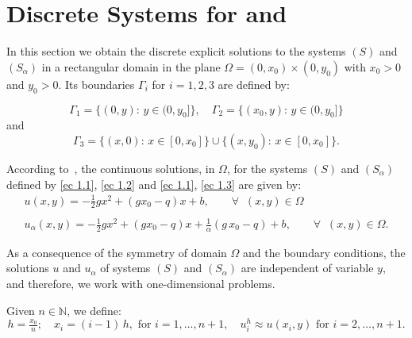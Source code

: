 \documentclass[11pt]{article}
\begin{document}


\section{Discrete Systems for  and }\label{sec2} %

In this section we obtain the discrete explicit solutions to the  systems $(S)$ and $(S_\alpha)$ in a rectangular  domain in the plane  $\Omega = (0, x_0) \times (0, y_0)$ with $x_0>0$ and $y_0 > 0$. Its boundaries $\Gamma_i$ for $i=1,2,3$  are defined by:


     \[\Gamma_1= \{(0,y):\, y\in (0,y_0]\}, \quad \Gamma_2= \{(x_0,y):\, y\in (0,y_0]\} \]
      and
 \[ \Gamma_3= \{(x,0):\, x\in [0,x_0]\} \cup \{(x,y_0):\, x\in [0,x_0]\}.\]
    
According to~\cite{BoGaTa2020}, the continuous solutions, in $\Omega$, for the systems $(S)$ and $(S_\alpha)$ defined by \eqref{ec 1.1}, \eqref{ec 1.2}
and \eqref{ec 1.1}, \eqref{ec 1.3} are given by:
\begin{equation}\label{Def: u y ualpha}
\begin{array}{ll}
 u (x, y) = -\tfrac{1}{2} g x^2 + (g x_0 - q) x +b, \qquad \forall \;\; (x,y) \in \Omega   \\ 
 \\
 u_\alpha (x, y)= -\tfrac{1}{2} g x^2 + (g x_0 - q) x + \tfrac{1}{\alpha} (g\,x_0 - q) +b ,\qquad \forall \;\; (x,y) \in \Omega. 
 \end{array}
 \end{equation}

 
As %
a consequence of the symmetry of domain $\Omega$ {and the boundary conditions},  the solutions $u$ and $u_\alpha$ of systems $(S)$ and $(S_\alpha)$ are independent of variable $y$, and therefore, we  work  with one-dimensional problems.
      

      
      Given $n \in \mathbb{N}$, we define:
          \begin{equation} \label{ec 2.1}
    	    h= \tfrac{x_0}{n}; \quad x_i = (i-1) \,h, \text{ for } i=1,\ldots, n+1, \quad {u^h_i} \approx  u(x_i, y)  \text{ for } i=2, \ldots,n+1.
          \end{equation}
    
\end{document}
